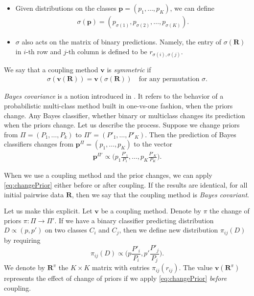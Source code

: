 \begin{itemize}
	\item Given  distributions on the classes $\boldsymbol{p}= (p_1, \ldots, p_K)$, we can define
	\begin{align}
		\sigma(\boldsymbol{p})= (p_{\sigma(1)},p_{\sigma(2)}, \ldots, p_{\sigma(K)}).
	\end{align}
	 \item $\sigma$ also acts on the matrix of binary predictions. Namely, the entry of $\sigma(\boldsymbol{R})$ in $i$-th row and $j$-th column is defined to be $r_{\sigma(i), \sigma(j)}$.
	 \end{itemize}
We say that a coupling method $\boldsymbol{v}$ is \emph{symmetric} if 
\begin{align}
		\sigma(\boldsymbol{v}(\boldsymbol{R})) = \boldsymbol{v}(\sigma(\boldsymbol{R}))\quad\textrm{for any permutation $\sigma$}. \label{eq:symmetry}
\end{align}

\emph{Bayes covariance} is a notion introduced in  \cite{vsuch2016bayes}. It refers to the behavior of a probabilistic multi-class method built in one-vs-one fashion, when the priors change. Any Bayes classifier, whether binary or multiclass changes its prediction when the priors change. Let us describe the process. Suppose we change priors from $\Pi = (P_1, \ldots, P_k)$ to $\Pi'= (P'_1, \ldots, P'_K)$. Then the prediction of Bayes classifiers changes from $\boldsymbol{p}^\Pi= (p_1, \ldots, p_K)$ to the vector 
\begin{align}
\boldsymbol{p}^{\Pi'} \propto \biggl(p_1 \frac{P'_1}{P_1}, \ldots, p_K \frac{P'_K}{P_K}\biggr). \label{eq:changePrior}
\end{align}

When we use a coupling method and the prior changes, we  can apply \eqref{eq:changePrior} either before or after coupling. If the results are identical, for all initial pairwise data $\boldsymbol{R}$, then we say that the coupling method is \emph{Bayes covariant}. 

Let us make this explicit. Let $\boldsymbol{v}$ be a coupling method. Denote by  $\pi$ the change of priors $\pi:\Pi \rightarrow \Pi'$. If we have a  binary classifier predicting distribution $D \propto (p, p')$ on two classes $C_i$ and $C_j$, then we define new distribution $\pi_{ij}(D)$ by requiring
$$
\pi_{ij}(D) \propto \biggl(p \frac{P'_i}{P_i},p' \frac{P'_j}{P_j}\biggr).
$$
We denote by $\boldsymbol{R}^\pi$ the $K\times K$ matrix with entries $\pi_{ij}(r_{ij})$. The value $\boldsymbol{v}(\boldsymbol{R}^\pi)$ represents the effect of change of priors if we apply \eqref{eq:changePrior} \emph{before} coupling.

